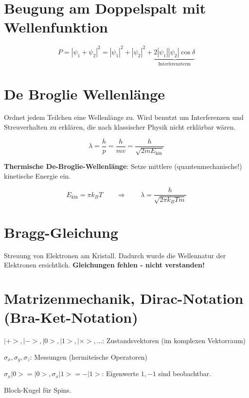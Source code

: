 \documentclass[a4paper,german,10pt,smallheadings]{scrartcl}
\begin{document}
\section{Beugung am Doppelspalt mit Wellenfunktion}

\begin{equation*}
  P = |\psi_1 + \psi_2|^2 = |\psi_1|^2 + |\psi_2|^2 + \underbrace{2 |\psi_1| |\psi_2| \cos \delta}_\text{Interferenzterm}
\end{equation*}

\section{De Broglie Wellenlänge}
Ordnet jedem Teilchen eine Wellenlänge zu. Wird benutzt um Interferenzen und
Streuverhalten zu erklären, die nach klassischer Physik nicht erklärbar wären.

\begin{equation*}
  \lambda = \frac{h}{p} = \frac{h}{mv} = \frac{h}{\sqrt{2 m E_\text{kin}}}
\end{equation*}

\textbf{Thermische De-Broglie-Wellenlänge}: Setze mittlere (quantenmechanische!) kinetische Energie
ein.

\vspace{-20pt}
\begin{equation*}
  E_\text{kin} = \pi k_B T
  \quad\quad\Rightarrow\quad\quad
  \lambda = \frac{h}{\sqrt{2 \pi k_B T m}} 
\end{equation*}

\section{Bragg-Gleichung}

Streuung von Elektronen am Kristall. Dadurch wurde die Wellennatur der
Elektronen ersichtlich. \textbf{Gleichungen fehlen - nicht verstanden!}


\section{Matrizenmechanik, Dirac-Notation (Bra-Ket-Notation)}

$|+>, |->, |0>, |1>, |\times>, \dots$: Zustandsvektoren (im komplexen Vektorraum)

$\sigma_x, \sigma_y, \sigma_z$: Messungen (hermiteische Operatoren)

$\sigma_x|0> = |0>, \sigma_x |1> = -|1>$: Eigenwerte $1, -1$ sind beobachtbar.

Bloch-Kugel für Spins.
\end{document}
